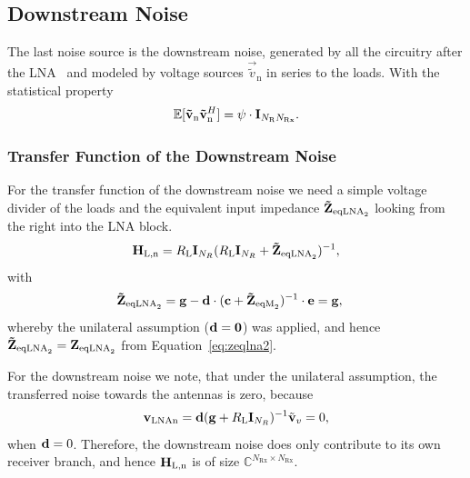 \subsection{Downstream Noise}
\label{sec:down_noise}
The last noise source is the downstream noise, generated by all the circuitry after the LNA~\cite{Hughes2012} and modeled by voltage sources $\vec{\tilde{v}}_\text{n}$ in series to the loads.
With the statistical property
\begin{equation}
\label{eq:cov_down}
\mathbb{E}[\mathbf{\tilde{v}}_\text{n}\mathbf{\tilde{v}}_\text{n}^H] = \psi\cdot\mathbf{I}_{N_\text{R}N_\text{Rx}}.
\end{equation}

\subsubsection{Transfer Function of the Downstream Noise}
\label{sec:down_noise_transf}
For the transfer function of the downstream noise we need a simple voltage divider of the loads and the equivalent input impedance $\mathbf{\tilde{Z}}_{\text{eqLNA}_2}$ looking from the right into the LNA block.
\begin{equation}
\label{eq:down_tf}
\mathbf{H}_\text{L,n} = R_\text{L}\mathbf{I}_{N_R}(R_\text{L}\mathbf{I}_{N_R} + \mathbf{\tilde{Z}}_{\text{eqLNA}_2})^{-1},
\end{equation}
with 
\begin{align}
\label{eq:zeqlna2_down}
\mathbf{\tilde{Z}}_{\text{eqLNA}_2} &= \mathbf{g} - \mathbf{d}\cdot(\mathbf{c} + \mathbf{\tilde{Z}}_{\text{eqM}_2})^{-1}\cdot\mathbf{e} = \mathbf{g},
\end{align}
whereby the unilateral assumption ($\mathbf{d}=\mathbf{0}$) was applied, and hence $\mathbf{\tilde{Z}}_{\text{eqLNA}_2}=\mathbf{Z}_{\text{eqLNA}_2}$ from Equation~\eqref{eq:zeqlna2}.

For the downstream noise we note, that under the unilateral assumption, the transferred noise towards the antennas is zero, because
\begin{align}
\mathbf{v}_\text{LNAn} = \mathbf{d}(\mathbf{g}+R_\text{L}\mathbf{I}_{N_R})^{-1} \tilde{\mathbf{v}}_{v}=0,
\end{align}
when $\mathbf{d}=0$.
Therefore, the downstream noise does only contribute to its own receiver branch, and hence $\mathbf{H}_\text{L,n}$ is of size $\mathbb{C}^{N_\text{Rx}\times N_\text{Rx}}$.

